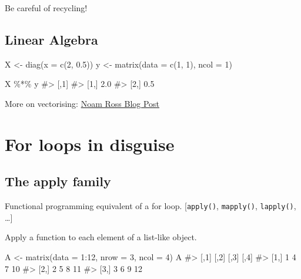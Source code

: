 \documentclass[
  letterpaper,
  DIV=11,
  numbers=noendperiod]{scrreprt}
\newenvironment{Shaded}{\begin{snugshade}}{\end{snugshade}}
\newcommand{\AttributeTok}[1]{\textcolor[rgb]{0.40,0.45,0.13}{#1}}
\newcommand{\CommentTok}[1]{\textcolor[rgb]{0.37,0.37,0.37}{#1}}
\newcommand{\DecValTok}[1]{\textcolor[rgb]{0.68,0.00,0.00}{#1}}
\newcommand{\FloatTok}[1]{\textcolor[rgb]{0.68,0.00,0.00}{#1}}
\newcommand{\FunctionTok}[1]{\textcolor[rgb]{0.28,0.35,0.67}{#1}}
\newcommand{\NormalTok}[1]{\textcolor[rgb]{0.00,0.23,0.31}{#1}}
\newcommand{\OtherTok}[1]{\textcolor[rgb]{0.00,0.23,0.31}{#1}}
\newcommand{\SpecialCharTok}[1]{\textcolor[rgb]{0.37,0.37,0.37}{#1}}
\begin{document}
Be careful of recycling!

\subsection{Linear Algebra}\label{linear-algebra}

\begin{Shaded}
\begin{Highlighting}[]
\NormalTok{X }\OtherTok{\textless{}{-}} \FunctionTok{diag}\NormalTok{(}\AttributeTok{x =} \FunctionTok{c}\NormalTok{(}\DecValTok{2}\NormalTok{, }\FloatTok{0.5}\NormalTok{))}
\NormalTok{y }\OtherTok{\textless{}{-}} \FunctionTok{matrix}\NormalTok{(}\AttributeTok{data =} \FunctionTok{c}\NormalTok{(}\DecValTok{1}\NormalTok{, }\DecValTok{1}\NormalTok{), }\AttributeTok{ncol =} \DecValTok{1}\NormalTok{)}

\NormalTok{X }\SpecialCharTok{\%*\%}\NormalTok{ y}
\CommentTok{\#\textgreater{}      [,1]}
\CommentTok{\#\textgreater{} [1,]  2.0}
\CommentTok{\#\textgreater{} [2,]  0.5}
\end{Highlighting}
\end{Shaded}

More on vectorising:
\href{http://www.noamross.net/archives/2014-04-16-vectorization-in-r-why/}{Noam
Ross Blog Post}

\section{For loops in disguise}\label{for-loops-in-disguise}

\subsection{The apply family}\label{the-apply-family}

Functional programming equivalent of a for loop. {[}\texttt{apply()},
\texttt{mapply()}, \texttt{lapply()}, \ldots{]}

Apply a function to each element of a list-like object.

\begin{Shaded}
\begin{Highlighting}[]
\NormalTok{A }\OtherTok{\textless{}{-}} \FunctionTok{matrix}\NormalTok{(}\AttributeTok{data =} \DecValTok{1}\SpecialCharTok{:}\DecValTok{12}\NormalTok{, }\AttributeTok{nrow =} \DecValTok{3}\NormalTok{, }\AttributeTok{ncol =} \DecValTok{4}\NormalTok{)}
\NormalTok{A}
\CommentTok{\#\textgreater{}      [,1] [,2] [,3] [,4]}
\CommentTok{\#\textgreater{} [1,]    1    4    7   10}
\CommentTok{\#\textgreater{} [2,]    2    5    8   11}
\CommentTok{\#\textgreater{} [3,]    3    6    9   12}
\end{Highlighting}
\end{Shaded}
\end{document}
